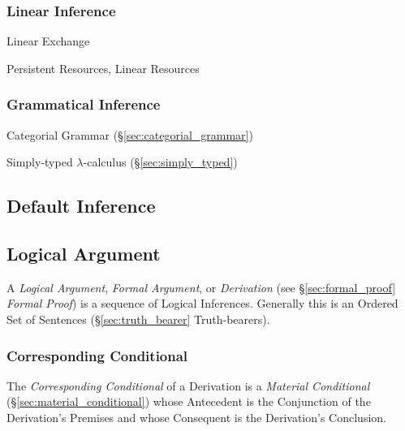 \subsubsection{Linear Inference}\label{sec:linear_inference}

Linear Exchange

Persistent Resources, Linear Resources



\subsubsection{Grammatical Inference}\label{sec:grammatical_inference}

\fist Categorial Grammar (\S\ref{sec:categorial_grammar})

\fist Simply-typed $\lambda$-calculus (\S\ref{sec:simply_typed})



\subsection{Default Inference}\label{sec:default_inference}

\subsection{Logical Argument}\label{sec:logical_argument}

A \emph{Logical Argument}, \emph{Formal Argument}, or
\emph{Derivation} (see \S\ref{sec:formal_proof} \emph{Formal Proof})
is a sequence of Logical Inferences. Generally this is an Ordered Set
of Sentences (\S\ref{sec:truth_bearer} Truth-bearers).



\subsubsection{Corresponding Conditional}\label{sec:corresponding_conditional}

The \emph{Corresponding Conditional} of a Derivation is a
\emph{Material Conditional} (\S\ref{sec:material_conditional}) whose
Antecedent is the Conjunction of the Derivation's Premises and whose
Consequent is the Derivation's Conclusion.



